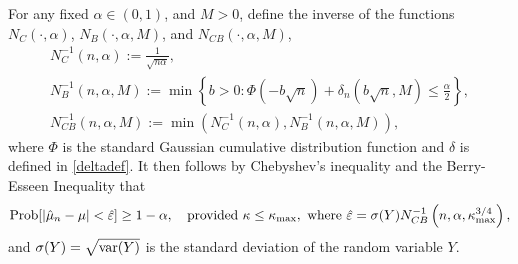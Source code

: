 \documentclass{iitthesis}
\begin{document}
For any fixed $\alpha \in (0,1)$, and $M>0$, define the inverse of the functions $N_C(\cdot,\alpha)$, $N_B(\cdot,\alpha,M)$, and $N_{CB}(\cdot,\alpha,M)$,
\begin{gather}\label{NCinv*}
N_C^{-1}(n,\alpha) := \frac{1}{\sqrt{n \alpha}}, \\
\label{NBinv*}
N_B^{-1}(n,\alpha,M) := \min \left \{ b>0 : \Phi\left(-b \sqrt{n}  \right)+\delta_n(b\sqrt{n},M)
\le \frac{\alpha}{2} \right \}, \\
\label{NCBinv}
N_{CB}^{-1}(n,\alpha,M) := \min\left(N_C^{-1}(n,\alpha),N_B^{-1}(n,\alpha,M)\right),
\end{gather}
where $\Phi$ is the standard Gaussian cumulative distribution function and $\delta$ is defined in \eqref{deltadef}. It then follows by Chebyshev's inequality and the Berry-Esseen Inequality that 
\begin{equation*}
\operatorname{Prob}[\left \lvert \hat{\mu}_n -\mu \right \rvert<\hat{\varepsilon}] \geq 1-\alpha, \quad \text{provided } \kappa\leq\kappa_{\max}, \text{ where }\hat{\varepsilon}=\sigma(Y) N_{CB}^{-1}\left(n,\alpha,\kappa_{\max}^{3/4}\right), 
\end{equation*} 
and $\sigma(Y)=\sqrt{\operatorname{var}(Y)}$ is the standard deviation of the random variable $Y$.  
\end{document}
